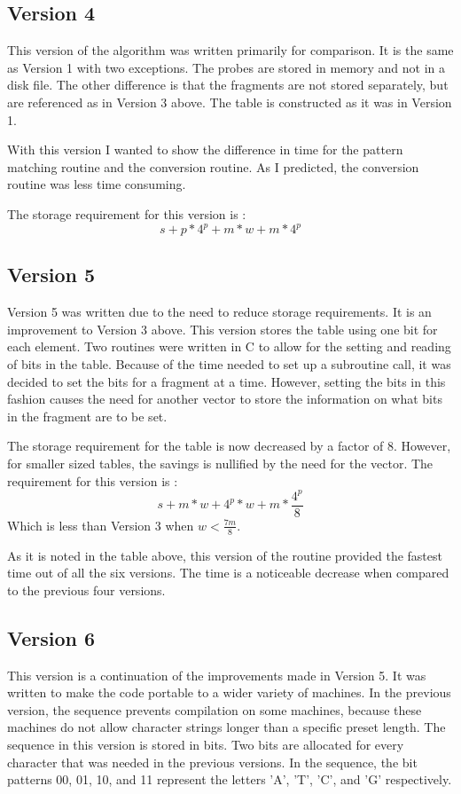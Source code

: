 \subsection{Version 4}
This version of the algorithm was written primarily for comparison.  It is
the same as Version 1 with two exceptions.  The probes are stored in memory
and not in a disk file.  The other difference is that the fragments are
not stored separately, but are referenced as in Version 3 above.  The
table is constructed as it was in Version 1.

With this version I wanted to show the difference in time for the pattern
matching routine and the conversion routine.  As I predicted, the
conversion routine was less time consuming.

The storage requirement for this version is :
\[ s + p*4^p + m*w + m*4^p \]

\subsection{Version 5}
Version 5 was written due to the need to reduce storage requirements.
It is an improvement to Version 3 above.
This version stores the table using one bit for each element.  Two routines
were written in C to allow for the setting and reading of bits in the table.
Because of the time needed to set up a subroutine call, it was decided to
set the bits for a fragment at a time.  However, setting the bits in this
fashion causes the need for another vector to store the information on what
bits in the fragment are to be set.

The storage requirement for the table is now decreased by a factor of 8.
However, for
smaller sized tables, the savings is nullified by the need for the vector.
The requirement for this version is :
\[ s + m*w + 4^p*w + m*\frac{4^p}{8} \]
Which is less than Version 3 when $w<\frac{7m}{8}$.

As it is noted in the table above, this version of the routine provided the
fastest time out of all the six versions.  The time is a noticeable decrease
when compared to the previous four versions.

\subsection{Version 6}

This version is a continuation of the improvements made in Version 5.  It
was written to make the code portable to a wider variety of machines.  In
the previous version, the sequence prevents compilation on some
machines, because these machines do not allow character strings longer than
a specific preset length.
The sequence in this version is stored in bits.  Two bits are allocated
for every character that was needed in the previous versions.  In the
sequence, the bit patterns 00, 01, 10, and 11 represent the letters 'A',
'T', 'C', and 'G' respectively.

